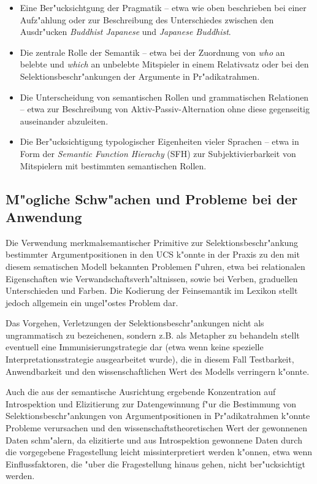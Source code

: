 \documentclass[a4paper]{article}
\begin{document}
\begin{itemize}
  \item Eine Ber"ucksichtgung der Pragmatik -- etwa wie oben beschrieben bei
  einer Aufz"ahlung oder zur Beschreibung des Unterschiedes zwischen den
  Ausdr"ucken \emph{Buddhist Japanese} und \emph{Japanese Buddhist}.
  \item  Die zentrale Rolle der Semantik -- etwa bei der Zuordnung von
  \emph{who} an belebte und \emph{which} an unbelebte Mitspieler in einem
  Relativsatz oder bei den Selektionsbeschr"ankungen der Argumente in
  Pr"adikatrahmen.
  \item Die Unterscheidung von semantischen Rollen und grammatischen Relationen
  -- etwa zur Beschreibung von Aktiv-Passiv-Alternation ohne diese gegenseitig
  auseinander abzuleiten.
  \item Die Ber"ucksichtigung typologischer Eigenheiten vieler Sprachen -- etwa
  in Form der \emph{Semantic Function Hierachy} (SFH) zur Subjektivierbarkeit
  von Mitspielern mit bestimmten semantischen Rollen.
\end{itemize}

\subsection{M"ogliche Schw"achen und Probleme bei der Anwendung}

Die Verwendung merkmalsemantischer Primitive zur Selektionsbeschr"ankung
bestimmter Argumentpositionen in den UCS k"onnte in der Praxis zu den mit
diesem sematischen Modell bekannten Problemen f"uhren, etwa bei relationalen
Eigenschaften wie Verwandschaftsverh"altnissen, sowie bei Verben, graduellen
Unterschieden und Farben. Die Kodierung der Feinsemantik im Lexikon stellt
jedoch allgemein ein ungel"ostes Problem dar.

Das Vorgehen, Verletzungen der Selektionsbeschr"ankungen nicht als
ungrammatisch zu bezeichenen, sondern z.B. als Metapher zu behandeln stellt
eventuell eine Immunisierungstrategie dar (etwa wenn keine spezielle
Interpretationsstrategie ausgearbeitet wurde), die in diesem Fall Testbarkeit,
Anwendbarkeit und den wissenschaftlichen Wert des Modells verringern k"onnte.

Auch die aus der semantische Ausrichtung ergebende Konzentration auf
Introspektion und Elizitierung zur Datengewinnung f"ur die Bestimmung von
Selektionsbeschr"ankungen von Argumentpositionen in Pr"adikatrahmen k"onnte
Probleme verursachen und den wissenschaftstheoretischen Wert der gewonnenen
Daten schm"alern, da elizitierte und aus Introspektion gewonnene Daten durch
die vorgegebene Fragestellung leicht missinterpretiert werden k"onnen, etwa
wenn Einflussfaktoren, die "uber die Fragestellung hinaus gehen, nicht
ber"ucksichtigt werden.
\end{document}
